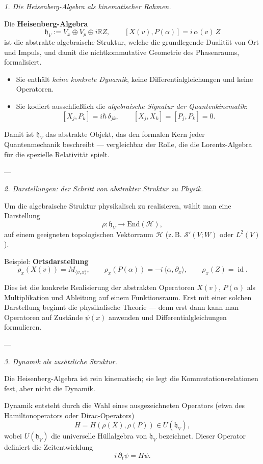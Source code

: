 \documentclass[10pt, letterpaper]{article}
\newcommand{\id}{\operatorname{id}}
\newcommand{\R}{\mathbb{R}}
\newcommand{\End}{\mathrm{End}}
\begin{document}
\emph{1. Die Heisenberg-Algebra als kinematischer Rahmen.}

Die \textbf{Heisenberg-Algebra}
\[
\mathfrak{h}_V := V_x \oplus V_p \oplus i\R Z, \qquad [X(v),P(\alpha)] = i\,\alpha(v)\,Z
\]
ist die abstrakte algebraische Struktur, welche die grundlegende Dualität von Ort und Impuls,
und damit die nichtkommutative Geometrie des Phasenraums, formalisiert.

\begin{itemize}
\item Sie enthält \emph{keine konkrete Dynamik}, keine Differentialgleichungen und keine Operatoren.
\item Sie kodiert ausschließlich die \emph{algebraische Signatur der Quantenkinematik}:
  \[
  [X_j,P_k] = i\hbar\,\delta_{jk}, \qquad [X_j,X_k]=[P_j,P_k]=0.
  \]
\end{itemize}

Damit ist \(\mathfrak{h}_V\) das abstrakte Objekt, das den formalen Kern jeder Quantenmechanik beschreibt —  
vergleichbar der Rolle, die die Lorentz-Algebra für die spezielle Relativität spielt.

---

\emph{2. Darstellungen: der Schritt von abstrakter Struktur zu Physik.}

Um die algebraische Struktur physikalisch zu realisieren, wählt man eine Darstellung
\[
\rho:\mathfrak{h}_V\longrightarrow\End(\mathcal{H}),
\]
auf einem geeigneten topologischen Vektorraum \(\mathcal{H}\) (z.\,B. \(\mathcal{S}'(V;W)\) oder \(L^2(V)\)).

Beispiel: \textbf{Ortsdarstellung}
\[
\rho_x(X(v)) = M_{\langle v,x\rangle},\qquad
\rho_x(P(\alpha)) = -i\,\langle \alpha,\partial_x\rangle,\qquad
\rho_x(Z)=\id.
\]

Dies ist die konkrete Realisierung der abstrakten Operatoren \(X(v)\), \(P(\alpha)\) als Multiplikation
und Ableitung auf einem Funktionsraum.  
Erst mit einer solchen Darstellung beginnt die physikalische Theorie — denn erst dann kann man Operatoren
auf Zustände \(\psi(x)\) anwenden und Differentialgleichungen formulieren.

---

\emph{3. Dynamik als zusätzliche Struktur.}

Die Heisenberg-Algebra ist rein kinematisch; sie legt die Kommutationsrelationen fest,
aber nicht die Dynamik.

Dynamik entsteht durch die Wahl eines ausgezeichneten Operators
(etwa des Hamiltonoperators oder Dirac-Operators)
\[
H = H(\rho(X),\rho(P)) \in U(\mathfrak{h}_V),
\]
wobei \(U(\mathfrak{h}_V)\) die universelle Hüllalgebra von \(\mathfrak{h}_V\) bezeichnet.
Dieser Operator definiert die Zeitentwicklung
\[
i\,\partial_t \psi = H \psi.
\]
\end{document}

